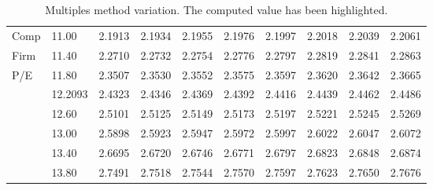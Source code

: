 \documentclass{article}
\begin{document}
\begin{table}[h]
\begin{tabular}{llllllllll}
\multicolumn{1}{l|}{Comp} & \multicolumn{1}{l|}{11.00}   & \multicolumn{1}{l|}{2.1913} & \multicolumn{1}{l|}{2.1934} & \multicolumn{1}{l|}{2.1955} & \multicolumn{1}{l|}{2.1976} & \multicolumn{1}{l|}{2.1997}                         & \multicolumn{1}{l|}{2.2018} & \multicolumn{1}{l|}{2.2039} & \multicolumn{1}{l|}{2.2061} \\ \cline{2-10} 
\multicolumn{1}{l|}{Firm} & \multicolumn{1}{l|}{11.40}   & \multicolumn{1}{l|}{2.2710} & \multicolumn{1}{l|}{2.2732} & \multicolumn{1}{l|}{2.2754} & \multicolumn{1}{l|}{2.2776} & \multicolumn{1}{l|}{2.2797}                         & \multicolumn{1}{l|}{2.2819} & \multicolumn{1}{l|}{2.2841} & \multicolumn{1}{l|}{2.2863} \\ \cline{2-10} 
\multicolumn{1}{l|}{P/E}  & \multicolumn{1}{l|}{11.80}   & \multicolumn{1}{l|}{2.3507} & \multicolumn{1}{l|}{2.3530} & \multicolumn{1}{l|}{2.3552} & \multicolumn{1}{l|}{2.3575} & \multicolumn{1}{l|}{2.3597}                         & \multicolumn{1}{l|}{2.3620} & \multicolumn{1}{l|}{2.3642} & \multicolumn{1}{l|}{2.3665} \\ \cline{2-10} 
\multicolumn{1}{l|}{}     & \multicolumn{1}{l|}{12.2093} & \multicolumn{1}{l|}{2.4323} & \multicolumn{1}{l|}{2.4346} & \multicolumn{1}{l|}{2.4369} & \multicolumn{1}{l|}{2.4392} & \multicolumn{1}{l|}{\cellcolor[HTML]{F8FF00}2.4416} & \multicolumn{1}{l|}{2.4439} & \multicolumn{1}{l|}{2.4462} & \multicolumn{1}{l|}{2.4486} \\ \cline{2-10} 
\multicolumn{1}{l|}{}     & \multicolumn{1}{l|}{12.60}   & \multicolumn{1}{l|}{2.5101} & \multicolumn{1}{l|}{2.5125} & \multicolumn{1}{l|}{2.5149} & \multicolumn{1}{l|}{2.5173} & \multicolumn{1}{l|}{2.5197}                         & \multicolumn{1}{l|}{2.5221} & \multicolumn{1}{l|}{2.5245} & \multicolumn{1}{l|}{2.5269} \\ \cline{2-10} 
\multicolumn{1}{l|}{}     & \multicolumn{1}{l|}{13.00}   & \multicolumn{1}{l|}{2.5898} & \multicolumn{1}{l|}{2.5923} & \multicolumn{1}{l|}{2.5947} & \multicolumn{1}{l|}{2.5972} & \multicolumn{1}{l|}{2.5997}                         & \multicolumn{1}{l|}{2.6022} & \multicolumn{1}{l|}{2.6047} & \multicolumn{1}{l|}{2.6072} \\ \cline{2-10} 
\multicolumn{1}{l|}{}     & \multicolumn{1}{l|}{13.40}   & \multicolumn{1}{l|}{2.6695} & \multicolumn{1}{l|}{2.6720} & \multicolumn{1}{l|}{2.6746} & \multicolumn{1}{l|}{2.6771} & \multicolumn{1}{l|}{2.6797}                         & \multicolumn{1}{l|}{2.6823} & \multicolumn{1}{l|}{2.6848} & \multicolumn{1}{l|}{2.6874} \\ \cline{2-10} 
\multicolumn{1}{l|}{}     & \multicolumn{1}{l|}{13.80}   & \multicolumn{1}{l|}{2.7491} & \multicolumn{1}{l|}{2.7518} & \multicolumn{1}{l|}{2.7544} & \multicolumn{1}{l|}{2.7570} & \multicolumn{1}{l|}{2.7597}                         & \multicolumn{1}{l|}{2.7623} & \multicolumn{1}{l|}{2.7650} & \multicolumn{1}{l|}{2.7676} \\ \cline{2-10} 
\end{tabular}
\caption{Multiples method variation. The computed value has been highlighted.}
\label{tab:mult_val}
\end{table}
\end{document}
